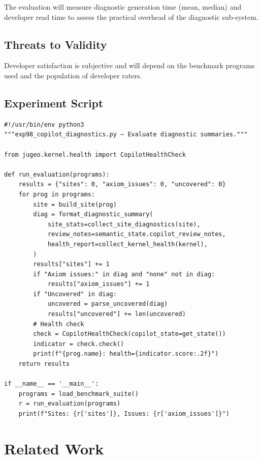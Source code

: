 \documentclass[11pt]{article}
\begin{document}
The evaluation will measure diagnostic generation time (mean, median)
and developer read time to assess the practical overhead of the diagnostic
sub-system.

\subsection{Threats to Validity}

Developer satisfaction is subjective and will depend on the benchmark
programs used and the population of developer raters.

\subsection{Experiment Script}

\begin{lstlisting}[style=jugeo-python]
#!/usr/bin/env python3
"""exp98_copilot_diagnostics.py — Evaluate diagnostic summaries."""

from jugeo.kernel.health import CopilotHealthCheck

def run_evaluation(programs):
    results = {"sites": 0, "axiom_issues": 0, "uncovered": 0}
    for prog in programs:
        site = build_site(prog)
        diag = format_diagnostic_summary(
            site_stats=collect_site_diagnostics(site),
            review_notes=semantic_state.copilot_review_notes,
            health_report=collect_kernel_health(kernel),
        )
        results["sites"] += 1
        if "Axiom issues:" in diag and "none" not in diag:
            results["axiom_issues"] += 1
        if "Uncovered" in diag:
            uncovered = parse_uncovered(diag)
            results["uncovered"] += len(uncovered)
        # Health check
        check = CopilotHealthCheck(copilot_state=get_state())
        indicator = check.check()
        print(f"{prog.name}: health={indicator.score:.2f}")
    return results

if __name__ == '__main__':
    programs = load_benchmark_suite()
    r = run_evaluation(programs)
    print(f"Sites: {r['sites']}, Issues: {r['axiom_issues']}")
\end{lstlisting}

\section{Related Work}\label{sec:related}
\end{document}
